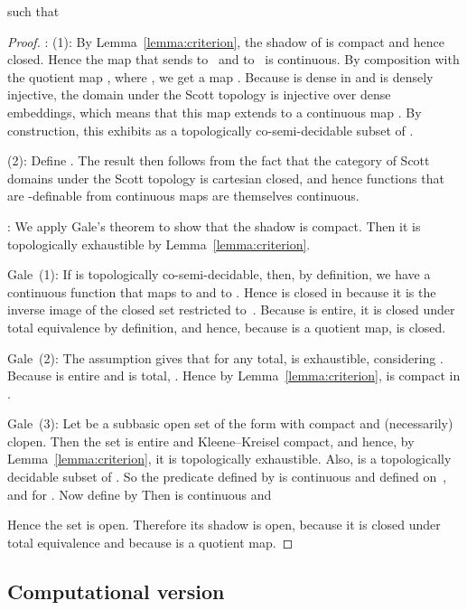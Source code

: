 \documentclass{LMCS}
\begin{document}
such that



\begin{proof}
  : (1): By Lemma~\ref{lemma:criterion}, the shadow
   of  is compact and hence closed.
  Hence the map  that sends  to~
  and  to~ is continuous. By composition with
  the quotient map , where , we get a map . Because  is dense in  and  is densely injective, the domain
   under the Scott topology is injective over
  dense embeddings, which means that this map extends to a continuous
  map .  By construction, this exhibits  as
  a topologically co-semi-decidable subset of .

  (2): Define . 
  The result then follows from the fact that the category of Scott
  domains under the Scott topology is cartesian closed, and hence
  functions that are -definable from continuous maps are
  themselves continuous. 

  : We apply Gale's theorem to show that the shadow
   is compact. Then it is topologically exhaustible by
  Lemma~\ref{lemma:criterion}. 

  Gale~(1): If  is topologically co-semi-decidable, then, by
  definition, we have a continuous function 
  that maps  to  and  to .  Hence
   is closed in  because it is the inverse image of the closed
  set  restricted to~.  Because  is entire, it is
  closed under total equivalence by definition, and hence, because
   is a quotient map,  is closed.

  Gale~(2): The assumption gives that for any  total, 
  is exhaustible, considering . Because  is entire
  and  is total, . Hence by
  Lemma~\ref{lemma:criterion},  is compact in .

  \pagebreak[3] Gale~(3): Let  be a subbasic open
  set of the form  with  compact and  (necessarily) clopen. Then the set 
  is entire and Kleene--Kreisel compact, and hence, by
  Lemma~\ref{lemma:criterion}, it is topologically exhaustible. Also,
   is a topologically decidable subset of . So the predicate
   defined by  is continuous and defined on~, and 
  for .  Now define  by  Then
   is continuous and
  
  Hence the set  is open. Therefore
  its shadow  is open,
  because it is closed under total equivalence and because  is a
  quotient map. \end{proof}



\subsection{Computational version}
\label{arzela}
\end{document}
